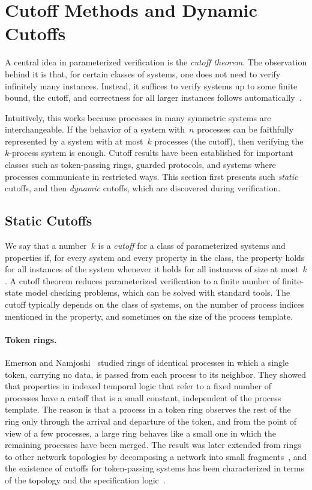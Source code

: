 \section{Cutoff Methods and Dynamic Cutoffs}
\label{sec:cutoff}

A central idea in parameterized verification is the \emph{cutoff theorem}.
The observation behind it is that, for certain classes of systems, one does
not need to verify infinitely many instances. Instead, it
suffices to verify systems up to some finite bound, the cutoff, and
correctness for all larger instances follows automatically~\cite{EN95,EK00}.

Intuitively, this works because processes in many symmetric systems are
interchangeable. If the behavior of a system with~$n$ processes can be
faithfully represented by a system with at most~$k$ processes (the cutoff),
then verifying the $k$-process system is enough. Cutoff results have been
established for important classes such as token-passing rings, guarded
protocols, and systems where processes communicate in restricted ways. This
section first presents such \emph{static} cutoffs, and then \emph{dynamic}
cutoffs, which are discovered during verification.

\subsection{Static Cutoffs}

We say that a number~$k$ is a \emph{cutoff} for a class of parameterized
systems and properties if, for every system and every property in the class,
the property holds for all instances of the system whenever it holds for all
instances of size at most~$k$. A cutoff theorem reduces parameterized
verification to a finite number of finite-state model checking problems, which
can be solved with standard tools. The cutoff typically depends on the class
of systems, on the number of process indices mentioned in the property, and
sometimes on the size of the process template.

\paragraph{Token rings.}
Emerson and Namjoshi~\cite{EN95} studied rings of identical processes in which
a single token, carrying no data, is passed from each process to its neighbor.
They showed that properties in indexed temporal logic that refer to a fixed
number of processes have a cutoff that is a small constant, independent of the
process template. The reason is that a process in a token ring observes the
rest of the ring only through the arrival and departure of the token, and from
the point of view of a few processes, a large ring behaves like a small one in
which the remaining processes have been merged. The result was later extended
from rings to other network topologies by decomposing a network into small
fragments~\cite{CTTV04}, and the existence of cutoffs for token-passing systems
has been characterized in terms of the topology and the specification
logic~\cite{AJKR14}.

